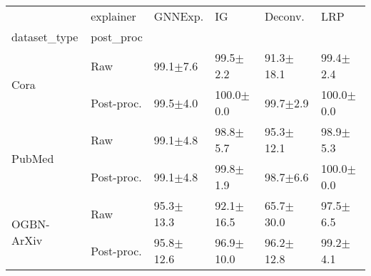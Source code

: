 \begin{tabular}{llllll}
 & explainer & GNNExp. & IG & Deconv. & LRP \\
dataset_type & post_proc &  &  &  &  \\
\multirow[c]{2}{*}{Cora} & Raw & {\cellcolor[HTML]{62BB6D}} \color[HTML]{F1F1F1} 99.1$\pm$7.6 & {\cellcolor[HTML]{218944}} \color[HTML]{F1F1F1} 99.5$\pm$2.2 & {\cellcolor[HTML]{F7FCF5}} \color[HTML]{000000} 91.3$\pm$18.1 & {\cellcolor[HTML]{319A50}} \color[HTML]{F1F1F1} 99.4$\pm$2.4 \\
 & Post-proc. & {\cellcolor[HTML]{278F48}} \color[HTML]{F1F1F1} 99.5$\pm$4.0 & {\cellcolor[HTML]{00441B}} \color[HTML]{F1F1F1} 100.0$\pm$0.0 & {\cellcolor[HTML]{05712F}} \color[HTML]{F1F1F1} 99.7$\pm$2.9 & {\cellcolor[HTML]{00441B}} \color[HTML]{F1F1F1} 100.0$\pm$0.0 \\
\multirow[c]{2}{*}{PubMed} & Raw & {\cellcolor[HTML]{58A1CF}} \color[HTML]{F1F1F1} 99.1$\pm$4.8 & {\cellcolor[HTML]{97C6DF}} \color[HTML]{000000} 98.8$\pm$5.7 & {\cellcolor[HTML]{F7FBFF}} \color[HTML]{000000} 95.3$\pm$12.1 & {\cellcolor[HTML]{85BCDC}} \color[HTML]{000000} 98.9$\pm$5.3 \\
 & Post-proc. & {\cellcolor[HTML]{539ECD}} \color[HTML]{F1F1F1} 99.1$\pm$4.8 & {\cellcolor[HTML]{084990}} \color[HTML]{F1F1F1} 99.8$\pm$1.9 & {\cellcolor[HTML]{A9CFE5}} \color[HTML]{000000} 98.7$\pm$6.6 & {\cellcolor[HTML]{08306B}} \color[HTML]{F1F1F1} 100.0$\pm$0.0 \\
\multirow[c]{2}{*}{OGBN-ArXiv} & Raw & {\cellcolor[HTML]{9692C4}} \color[HTML]{F1F1F1} 95.3$\pm$13.3 & {\cellcolor[HTML]{E2E1EF}} \color[HTML]{000000} 92.1$\pm$16.5 & {\cellcolor[HTML]{FCFBFD}} \color[HTML]{000000} 65.7$\pm$30.0 & {\cellcolor[HTML]{6950A3}} \color[HTML]{F1F1F1} 97.5$\pm$6.5 \\
 & Post-proc. & {\cellcolor[HTML]{8C88BF}} \color[HTML]{F1F1F1} 95.8$\pm$12.6 & {\cellcolor[HTML]{7567AF}} \color[HTML]{F1F1F1} 96.9$\pm$10.0 & {\cellcolor[HTML]{807DBA}} \color[HTML]{F1F1F1} 96.2$\pm$12.8 & {\cellcolor[HTML]{4C1788}} \color[HTML]{F1F1F1} 99.2$\pm$4.1 \\
\end{tabular}
